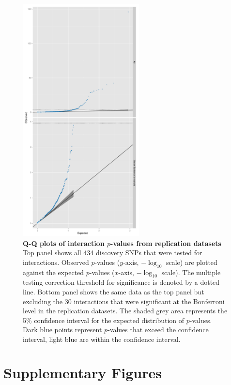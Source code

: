 \documentclass{article}
\begin{document}
\begin{figure}[H]
	\centering
	\includegraphics[width=2.5in]{qqMeta.pdf}
	\caption{\textbf{Q-Q plots of interaction $p$-values from replication datasets} Top panel shows all 434 discovery SNPs that were tested for interactions. Observed $p$-values ($y$-axis, $-\log_{10}$ scale) are plotted against the expected $p$-values ($x$-axis, $-\log_{10}$ scale). The multiple testing correction threshold for significance is denoted by a dotted line. Bottom panel shows the same data as the top panel but excluding the 30 interactions that were significant at the Bonferroni level in the replication datasets. The shaded grey area represents the 5\% confidence interval for the expected distribution of $p$-values. Dark blue points represent $p$-values that exceed the confidence interval, light blue are within the confidence interval.}
	\label{fig:qqMeta}
\end{figure}
\clearpage


\clearpage
\section{Supplementary Figures}
\setcounter{figure}{0}
\makeatletter 
\renewcommand{\thefigure}{S\@arabic\c@figure} 
\makeatletter 
\end{document}
